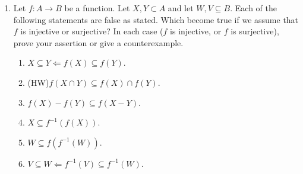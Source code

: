 \documentclass[12pt, reqno]{amsart}
\begin{document}
\begin{enumerate}
\item Let $f\colon A \to B$ be a function. Let $X,Y \subset
  A$ and let $W,V \subseteq B$. Each of the following statements are false as stated. Which
  become true if we assume that $f$ is injective or surjective? In
  each case ($f$ is injective, or $f$ is surjective), prove your
  assertion or give a counterexample.
  \begin{enumerate}
  \item $X \subseteq Y \Leftarrow f(X) \subseteq f(Y)$.
  \item (HW)$f(X \cap Y) \subseteq f(X) \cap f(Y)$.
  \item $f(X) - f(Y) \subseteq f(X - Y)$.
  \item $X \subseteq f^{-1}(f(X))$.
  \item $W \subseteq f(f^{-1}(W))$.
  \item $V \subseteq W \Leftarrow f^{-1}(V) \subseteq f^{-1}(W)$.
  \end{enumerate}


  
\end{enumerate}
\end{document}
